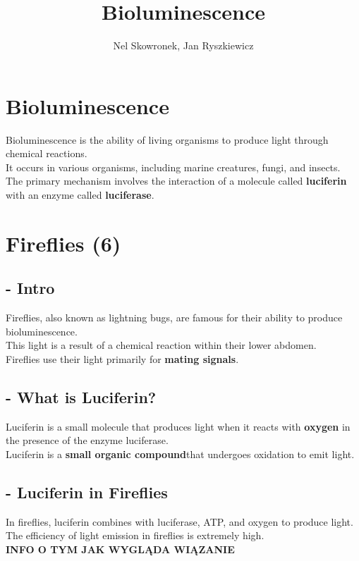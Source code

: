 \documentclass{article}
\title{Bioluminescence}
\author{Nel Skowronek, Jan Ryszkiewicz}
\date{}
\begin{document}
\maketitle

\section*{Bioluminescence}
Bioluminescence is the ability of living organisms to produce light through chemical reactions. \\
It occurs in various organisms, including marine creatures, fungi, and insects.\\
The primary mechanism involves the interaction of a molecule called \textbf{luciferin} with an enzyme called \textbf{luciferase}.


\section*{Fireflies (6)}

\subsection*{- Intro }
Fireflies, also known as lightning bugs, are famous for their ability to produce bioluminescence.\\ 
This light is a result of a chemical reaction within their lower abdomen.\\ 
Fireflies use their light primarily for \textbf{mating signals}.

\subsection*{- What is Luciferin? }
Luciferin is a small molecule that produces light when it reacts with \textbf{oxygen}
in the presence of the enzyme luciferase.\\ 
Luciferin is a \textbf{small organic compound}that undergoes oxidation to emit light.

\subsection*{- Luciferin in Fireflies }
In fireflies, luciferin combines with luciferase, ATP, and oxygen to produce light.\\
The efficiency of light emission in fireflies is extremely high.\\
\textbf{INFO O TYM JAK WYGLĄDA WIĄZANIE}
\end{document}
